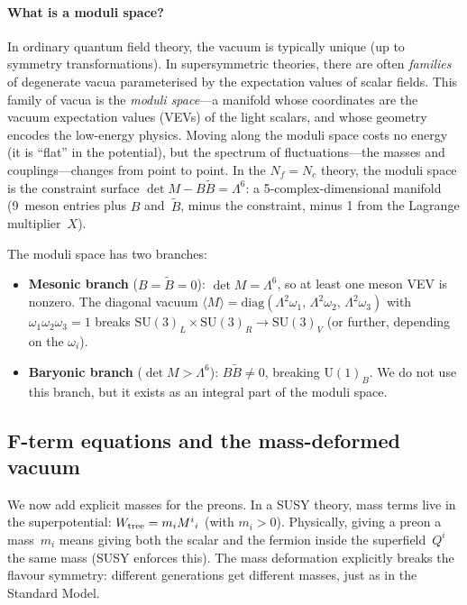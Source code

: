 \documentclass[12pt,a4paper]{article}
\newcommand{\SU}{\mathrm{SU}}
\newcommand{\UU}{\mathrm{U}}
\newcommand{\Nf}{N_f}
\newcommand{\Nc}{N_c}
\newcommand{\diag}{\mathrm{diag}}
\begin{document}
\paragraph{What is a moduli space?}
In ordinary quantum field theory, the vacuum is typically unique
(up to symmetry transformations). In supersymmetric theories,
there are often \emph{families} of degenerate vacua parameterised
by the expectation values of scalar fields.  This family of vacua
is the \emph{moduli space}---a manifold whose coordinates are the
vacuum expectation values (VEVs) of the light scalars, and whose
geometry encodes the low-energy physics.  Moving along the moduli
space costs no energy (it is ``flat'' in the potential), but the
spectrum of fluctuations---the masses and couplings---changes from
point to point.  In the $\Nf = \Nc$ theory, the moduli space is
the constraint surface $\det M - B\tilde B = \Lambda^6$: a
5-complex-dimensional manifold (9~meson entries plus $B$ and~$\tilde
B$, minus the constraint, minus 1 from the Lagrange multiplier~$X$).

The moduli space has two branches:
\begin{itemize}
  \item \textbf{Mesonic branch} ($B = \tilde{B} = 0$):
    $\det M = \Lambda^6$, so at least one meson VEV is nonzero. The
    diagonal vacuum $\langle M \rangle = \diag(\Lambda^2\omega_1,\,
    \Lambda^2\omega_2,\, \Lambda^2\omega_3)$ with
    $\omega_1\omega_2\omega_3 = 1$ breaks
    $\SU(3)_L \times \SU(3)_R \to \SU(3)_V$ (or further, depending on
    the $\omega_i$).
  \item \textbf{Baryonic branch} ($\det M > \Lambda^6$): $B\tilde{B}
    \neq 0$, breaking $\UU(1)_B$. We do not use this branch, but
    it exists as an integral part of the moduli space.
\end{itemize}

\subsection{F-term equations and the mass-deformed vacuum}
\label{sec:fterms}

We now add explicit masses for the preons. In a SUSY theory, mass
terms live in the superpotential: $W_{\rm tree} = m_i M^i{}_i$
(with $m_i > 0$). Physically, giving a preon a mass~$m_i$ means
giving both the scalar and the fermion inside the superfield~$Q^i$
the same mass (SUSY enforces this).  The mass deformation explicitly
breaks the flavour symmetry: different generations get different
masses, just as in the Standard Model.
\end{document}
